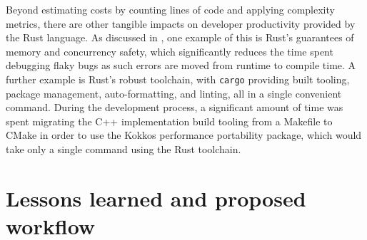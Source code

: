 Beyond estimating costs by counting lines of code and applying complexity metrics, there are other tangible impacts on developer productivity provided by the Rust language. As discussed in , one example of this is Rust's guarantees of memory and concurrency safety, which significantly reduces the time spent debugging flaky bugs as such errors are moved from runtime to compile time. A further example is Rust's robust toolchain, with \texttt{cargo} providing built tooling, package management, auto-formatting, and linting, all in a single convenient command. During the development process, a significant amount of time was spent migrating the C++ implementation build tooling from a Makefile to CMake in order to use the Kokkos performance portability package, which would take only a single command using the Rust toolchain.


\section{Lessons learned and proposed workflow} 
\label{sec:translation-workflow}







